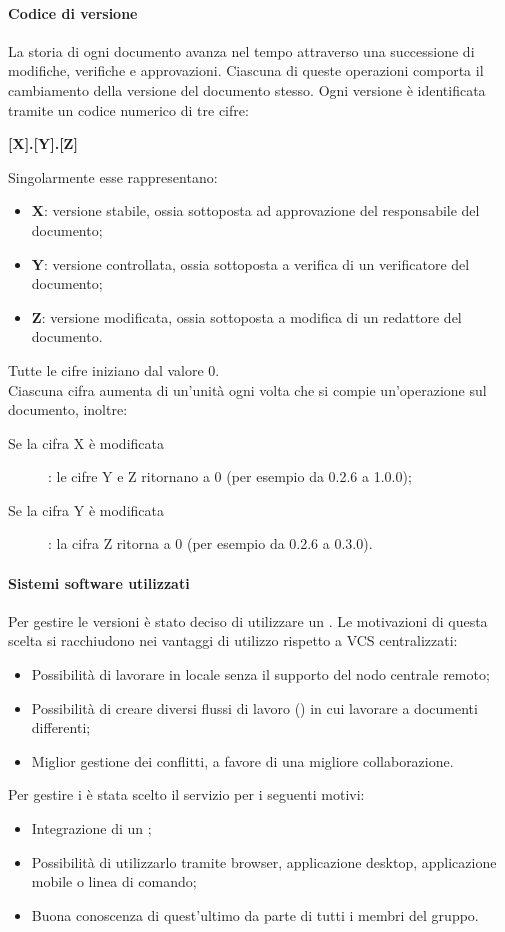 \paragraph{Codice di versione}
La storia di ogni documento avanza nel tempo attraverso una successione di modifiche, verifiche e approvazioni. Ciascuna di queste operazioni comporta il cambiamento della versione del documento stesso. Ogni versione è identificata tramite un codice numerico di tre cifre:
\begin{center}
\textbf{[X].[Y].[Z]} 
\end{center}
Singolarmente esse rappresentano:
\begin{itemize}
	\item \textbf{X}: versione stabile, ossia sottoposta ad approvazione del responsabile del documento;
  	\item \textbf{Y}: versione controllata, ossia sottoposta a verifica di un verificatore del documento;
  	\item \textbf{Z}: versione modificata, ossia sottoposta a modifica di un redattore del documento.
\end{itemize}
  
Tutte le cifre iniziano dal valore 0. \\ 
Ciascuna cifra aumenta di un'unità ogni volta che si compie un'operazione sul documento, inoltre:
\begin{description}
	\item[Se la cifra X è modificata] : le cifre Y e Z ritornano a 0 (per esempio da 0.2.6 a 1.0.0);
	\item[Se la cifra Y è modificata] : la cifra Z ritorna a 0 (per esempio da 0.2.6 a 0.3.0).
\end{description}

\paragraph{Sistemi software utilizzati}
Per gestire le versioni è stato deciso di utilizzare un  . 
Le motivazioni di questa scelta si racchiudono nei vantaggi di utilizzo rispetto a VCS centralizzati:
\begin{itemize}
	\item Possibilità di lavorare in locale senza il supporto del nodo centrale remoto; 
	\item Possibilità di creare diversi flussi di lavoro () in cui lavorare a documenti differenti;
	\item Miglior gestione dei conflitti, a favore di una migliore collaborazione.
\end{itemize}
Per gestire i   è stata scelto il servizio  per i seguenti motivi: 
\begin{itemize}
	\item Integrazione di un ;
	\item Possibilità di utilizzarlo tramite browser, applicazione desktop, applicazione mobile o linea di comando;
	\item Buona conoscenza di quest'ultimo da parte di tutti i membri del gruppo.
\end{itemize}

